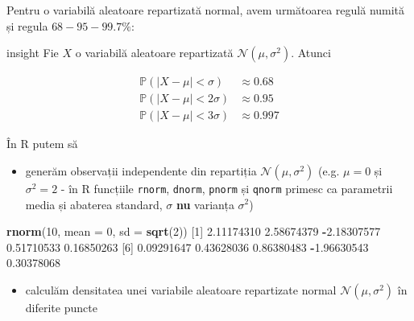 \documentclass[]{article}
\newenvironment{Shaded}{\begin{snugshade}}{\end{snugshade}}
\newcommand{\KeywordTok}[1]{\textcolor[rgb]{0.13,0.29,0.53}{\textbf{#1}}}
\newcommand{\DataTypeTok}[1]{\textcolor[rgb]{0.13,0.29,0.53}{#1}}
\newcommand{\DecValTok}[1]{\textcolor[rgb]{0.00,0.00,0.81}{#1}}
\newcommand{\FloatTok}[1]{\textcolor[rgb]{0.00,0.00,0.81}{#1}}
\newcommand{\OperatorTok}[1]{\textcolor[rgb]{0.81,0.36,0.00}{\textbf{#1}}}
\newcommand{\NormalTok}[1]{#1}
\providecommand{\tightlist}{%
  \setlength{\itemsep}{0pt}\setlength{\parskip}{0pt}}
\newenvironment{frshaded_insight*}{%
  \def\FrameCommand{\fboxrule=\FrameRule\fboxsep=\FrameSep \fcolorbox{framecolor_insight}{shadecolor_insight}}%
  \MakeFramed {\advance\hsize-\width \FrameRestore}}%
{\endMakeFramed}
\newenvironment{rmdblock_insight}[1]
  {\begin{frshaded_insight*}
  \begin{itemize}
  \renewcommand{\labelitemi}{
    \raisebox{-.7\height}[0pt][0pt]{
      {\setkeys{Gin}{width=2em,keepaspectratio}\texttt{[image: images/icons/\#1]}}
    }
  }
  \item
  }
  {
  \end{itemize}
  \end{frshaded_insight*}
  }
\newenvironment{rmdinsight}
  {\begin{rmdblock_insight}{insight}}
  {\end{rmdblock_insight}}
\begin{document}
Pentru o variabilă aleatoare repartizată normal, avem următoarea regulă
numită și regula \(68-95-99.7\%\):

\begin{rmdinsight}
Fie \(X\) o variabilă aleatoare repartizată
\(\mathcal{N}(\mu, \sigma^2)\). Atunci

\begin{align*}
  \mathbb{P}(|X-\mu|<\sigma) &\approx 0.68\\
  \mathbb{P}(|X-\mu|<2\sigma) &\approx 0.95\\
  \mathbb{P}(|X-\mu|<3\sigma) &\approx 0.997
\end{align*}
\end{rmdinsight}

În R putem să

\begin{itemize}
\tightlist
\item
  generăm observații independente din repartiția
  \(\mathcal{N}(\mu, \sigma^2)\) (e.g. \(\mu = 0\) și \(\sigma^2 = 2\) -
  în R funcțiile \texttt{rnorm}, \texttt{dnorm}, \texttt{pnorm} și
  \texttt{qnorm} primesc ca parametrii media și abaterea standard,
  \(\sigma\) \textbf{nu} varianța \(\sigma^2\))
\end{itemize}

\begin{Shaded}
\begin{Highlighting}[]
\KeywordTok{rnorm}\NormalTok{(}\DecValTok{10}\NormalTok{, }\DataTypeTok{mean =} \DecValTok{0}\NormalTok{, }\DataTypeTok{sd =} \KeywordTok{sqrt}\NormalTok{(}\DecValTok{2}\NormalTok{))}
\NormalTok{ [}\DecValTok{1}\NormalTok{]  }\FloatTok{2.11174310}  \FloatTok{2.58674379} \OperatorTok{-}\FloatTok{2.18307577}  \FloatTok{0.51710533}  \FloatTok{0.16850263}
\NormalTok{ [}\DecValTok{6}\NormalTok{]  }\FloatTok{0.09291647}  \FloatTok{0.43628036}  \FloatTok{0.86380483} \OperatorTok{-}\FloatTok{1.96630543}  \FloatTok{0.30378068}
\end{Highlighting}
\end{Shaded}

\begin{itemize}
\tightlist
\item
  calculăm densitatea unei variabile aleatoare repartizate normal
  \(\mathcal{N}(\mu, \sigma^2)\) în diferite puncte
\end{itemize}
\end{document}
